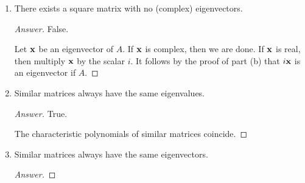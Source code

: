 \documentclass[../psets.tex]{subfiles}
\begin{document}
\begin{enumerate}[label={\textbf{1.\arabic*.}}]
\begin{enumerate}
\begin{proof}[Answer]
        \end{proof}
        \item There exists a square matrix with no (complex) eigenvectors.
        \begin{proof}[Answer]
            False.\par
            Let $\mathbf{x}$ be an eigenvector of $A$. If $\mathbf{x}$ is complex, then we are done. If $\mathbf{x}$ is real, then multiply $\mathbf{x}$ by the scalar $i$. It follows by the proof of part (b) that $i\mathbf{x}$ is an eigenvector if $A$.
        \end{proof}
        \item Similar matrices always have the same eigenvalues.
        \begin{proof}[Answer]
            True.\par
            The characteristic polynomials of similar matrices coincide.
        \end{proof}
        \item Similar matrices always have the same eigenvectors.
        \begin{proof}[Answer]



\end{proof}
\end{enumerate}
\end{enumerate}
\end{document}
